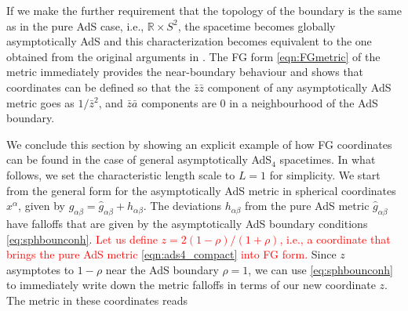 \documentclass[a4paper,11pt]{article}
\numberwithin{equation}{section}
\begin{document}
If we make the further requirement that the topology of the boundary is the same as in the pure AdS case, i.e., $\mathbb{R}\times S^2$, the spacetime becomes globally asymptotically AdS and this characterization becomes equivalent to the one obtained from the original arguments in \cite{Henneaux:1985tv}. 
The FG form \eqref{eqn:FGmetric} of the metric immediately provides the near-boundary behaviour and shows that coordinates can be defined so that the $\bar{z}\bar{z}$ component of any asymptotically AdS metric goes as $1/\bar{z}^2$, and $\bar{z}\bar{a}$ components are 0 in a neighbourhood of the AdS boundary.

We conclude this section by showing an explicit example of how FG coordinates can be found in the case of general asymptotically AdS$_4$ spacetimes. 
In what follows, we set the characteristic length scale to $L=1$ for simplicity.
We start from the general form for the asymptotically AdS metric in spherical coordinates $x^\alpha$, given by $g_{\alpha\beta}=\hat{g}_{\alpha\beta}+h_{\alpha\beta}$.
The deviations $h_{\alpha\beta}$ from the pure AdS metric $\hat{g}_{\alpha\beta}$ have falloffs that are given by the asymptotically AdS boundary conditions \eqref{eq:sphbounconh}.
\textcolor{red}{Let us define $z=2(1-\rho)/(1+\rho)$, i.e., a coordinate that brings the pure AdS metric \eqref{eqn:ads4_compact} into FG form.}
Since $z$ asymptotes to $1-\rho$ near the AdS boundary $\rho=1$, we can use \eqref{eq:sphbounconh} to immediately write down the metric falloffs in terms of our new coordinate $z$.
The metric in these coordinates reads
\end{document}
